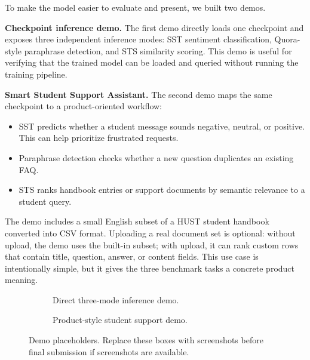 \documentclass{article}
\begin{document}
To make the model easier to evaluate and present, we built two demos.

\textbf{Checkpoint inference demo.} The first demo directly loads one checkpoint and exposes three independent inference modes: SST sentiment classification, Quora-style paraphrase detection, and STS similarity scoring. This demo is useful for verifying that the trained model can be loaded and queried without running the training pipeline.

\textbf{Smart Student Support Assistant.} The second demo maps the same checkpoint to a product-oriented workflow:

\begin{itemize}
    \item SST predicts whether a student message sounds negative, neutral, or positive. This can help prioritize frustrated requests.
    \item Paraphrase detection checks whether a new question duplicates an existing FAQ.
    \item STS ranks handbook entries or support documents by semantic relevance to a student query.
\end{itemize}

The demo includes a small English subset of a HUST student handbook converted into CSV format. Uploading a real document set is optional: without upload, the demo uses the built-in subset; with upload, it can rank custom rows that contain title, question, answer, or content fields. This use case is intentionally simple, but it gives the three benchmark tasks a concrete product meaning.

\begin{figure}[h]
\centering
\begin{subfigure}[t]{0.48\textwidth}
\centering
{}
\caption{Direct three-mode inference demo.}
\end{subfigure}
\hfill
\begin{subfigure}[t]{0.48\textwidth}
\centering
{}
\caption{Product-style student support demo.}
\end{subfigure}
\caption{Demo placeholders. Replace these boxes with screenshots before final submission if screenshots are available.}
\label{fig:demo-placeholders}
\end{figure}
\end{document}
